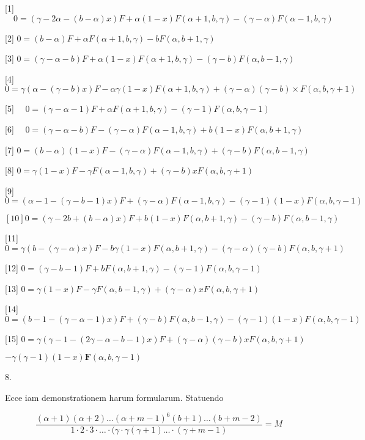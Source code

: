 \documentclass[10pt]{article}
\begin{document}
[1] \(\quad 0=(\gamma-2 \alpha-(b-\alpha) x) F+\alpha(1-x) F(\alpha+1, b, \gamma)-(\gamma-\alpha) F(\alpha-1, b, \gamma)\)

[2] \(0=(b-\alpha) F+\alpha F(\alpha+1, b, \gamma)-b F(\alpha, b+1, \gamma)\)

[3] \(0=(\gamma-\alpha-b) F+\alpha(1-x) F(\alpha+1, b, \gamma)-(\gamma-b) F(\alpha, b-1, \gamma)\)

[4] \(0=\gamma(\alpha-(\gamma-b) x) F-\alpha \gamma(1-x) F(\alpha+1, b, \gamma)+(\gamma-\alpha)(\gamma-b) \times F(\alpha, b, \gamma+1)\)

[5] \(\quad 0=(\gamma-\alpha-1) F+\alpha F(\alpha+1, b, \gamma)-(\gamma-1) F(\alpha, b, \gamma-1)\)

[6] \(\quad 0=(\gamma-\alpha-b) F-(\gamma-\alpha) F(\alpha-1, b, \gamma)+b(1-x) F(\alpha, b+1, \gamma)\)

[7] \(0=(b-\alpha)(1-x) F-(\gamma-\alpha) F(\alpha-1, b, \gamma)+(\gamma-b) F(\alpha, b-1, \gamma)\)

[8] \(0=\gamma(1-x) F-\gamma F(\alpha-1, b, \gamma)+(\gamma-b) x F(\alpha, b, \gamma+1)\)

[9] \(0=(\alpha-1-(\gamma-b-1) x) F+(\gamma-\alpha) F(\alpha-1, b, \gamma)-(\gamma-1)(1-x) F(\alpha, b, \gamma-1)\)

\([10] 0=(\gamma-2 b+(b-\alpha) x) F+b(1-x) F(\alpha, b+1, \gamma)-(\gamma-b) F(\alpha, b-1, \gamma)\)

[11] \(0=\gamma(b-(\gamma-\alpha) x) F-b \gamma(1-x) F(\alpha, b+1, \gamma)-(\gamma-\alpha)(\gamma-b) F(\alpha, b, \gamma+1)\)

[12] \(0=(\gamma-b-1) F+b F(\alpha, b+1, \gamma)-(\gamma-1) F(\alpha, b, \gamma-1)\)

[13] \(0=\gamma(1-x) F-\gamma F(\alpha, b-1, \gamma)+(\gamma-\alpha) x F(\alpha, b, \gamma+1)\)

[14] \(0=(b-1-(\gamma-\alpha-1) x) F+(\gamma-b) F(\alpha, b-1, \gamma)-(\gamma-1)(1-x) F(\alpha, b, \gamma-1)\)

[15] \(0=\gamma(\gamma-1-(2 \gamma-\alpha-b-1) x) F+(\gamma-\alpha)(\gamma-b) x F(\alpha, b, \gamma+1)\)

\(-\gamma(\gamma-1)(1-x) \boldsymbol{F}(\alpha, b, \gamma-1)\)

8.

Ecce iam demonstrationem harum formularum. Statuendo

\[
\frac{(\alpha+1)(\alpha+2) \ldots(\alpha+m-1)^{6}(b+1) \ldots(b+m-2)}{1 \cdot 2 \cdot 3 \cdot \ldots \cdot(\gamma \cdot \gamma(\gamma+1) \ldots \cdot(\gamma+m-1)}=M
\]
\end{document}
